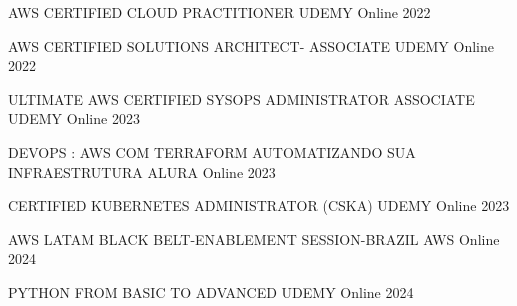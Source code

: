 

\begin{cvhonors}

  \cvhonor
    {AWS CERTIFIED CLOUD PRACTITIONER} %
    {UDEMY} %
    {Online} %
    {2022} %

  \cvhonor
    {AWS CERTIFIED SOLUTIONS ARCHITECT- ASSOCIATE} %
    {UDEMY} %
    {Online} %
    {2022} %

  \cvhonor
    {ULTIMATE AWS CERTIFIED SYSOPS ADMINISTRATOR ASSOCIATE} %
    {UDEMY} %
    {Online} %
    {2023} %

  \cvhonor
    {DEVOPS : AWS COM TERRAFORM AUTOMATIZANDO SUA INFRAESTRUTURA} %
    {ALURA} %
    {Online} %
    {2023} %

  \cvhonor
    {CERTIFIED KUBERNETES ADMINISTRATOR (CSKA)} %
    {UDEMY} %
    {Online} %
    {2023} %

  \cvhonor
    {AWS LATAM BLACK BELT-ENABLEMENT SESSION-BRAZIL} %
    {AWS} %
    {Online} %
    {2024} %

  \cvhonor
    {PYTHON FROM BASIC TO ADVANCED} %
    {UDEMY} %
    {Online} %
    {2024} %


\end{cvhonors}
